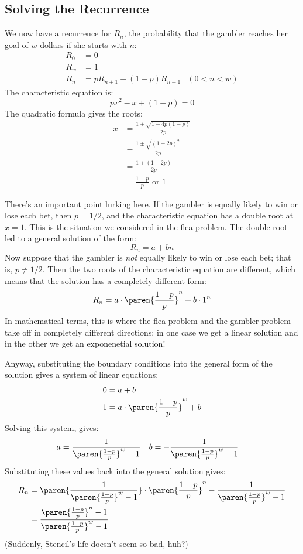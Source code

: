 \subsection{Solving the Recurrence}

We now have a recurrence for $R_n$, the probability that the gambler
reaches her goal of $w$ dollars if she starts with $n$:
%
\begin{align*}
R_0 & = 0 \\
R_w & = 1 \\
R_n & = p R_{n+1} + (1 - p) R_{n-1} & (0 < n < w)
\end{align*}
%
The characteristic equation is:
%
\[
p x^2 - x + (1-p) = 0
\]
%
The quadratic formula gives the roots:
%
\begin{align*}
x & = \frac{1 \pm \sqrt{1 - 4 p (1-p)}}{2p} \\
  & = \frac{1 \pm \sqrt{(1-2p)^2}}{2p} \\
  & = \frac{1 \pm (1-2p)}{2p} \\
  & = \frac{1-p}{p} \text{ or } 1
\end{align*}

There's an important point lurking here.  If the gambler is equally
likely to win or lose each bet, then $p = 1/2$, and the characteristic
equation has a double root at $x = 1$.  This is the situation we
considered in the flea problem.  The double root led to a general
solution of the form:
%
\[
R_n = a + b n
\]
%
Now suppose that the gambler is \emph{not} equally likely to win or
lose each bet; that is, $p \neq 1/2$.  Then the two roots of the
characteristic equation are different, which means that the solution
has a completely different form:
%
\[
R_n = a \cdot \paren{\frac{1-p}{p}}^n + b \cdot 1^n
\]
%
In mathematical terms, this is where the flea problem and the gambler
problem take off in completely different directions: in one case we
get a linear solution and in the other we get an exponenetial
solution!

Anyway, substituting the boundary conditions into the general form of
the solution gives a system of linear equations:
%
\begin{align*}
0 & = a + b \\
1 & = a \cdot \paren{\frac{1-p}{p}}^w + b
\end{align*}
%
Solving this system, gives:
%
\begin{align*}
a & = \frac{1}{\paren{\frac{1-p}{p}}^w-1} &
b & = - \frac{1}{\paren{\frac{1-p}{p}}^w-1} &
\end{align*}
%
Substituting these values back into the general solution gives:
%
\begin{align*}
R_n
    & = \paren{\frac{1}{\paren{\frac{1-p}{p}}^w-1}} \cdot
        \paren{\frac{1-p}{p}}^n - \frac{1}{\paren{\frac{1-p}{p}}^w-1} \\
    & = \frac{\paren{\frac{1-p}{p}}^n-1}{\paren{\frac{1-p}{p}}^w-1}
\end{align*}
%
(Suddenly, Stencil's life doesn't seem so bad, huh?)

